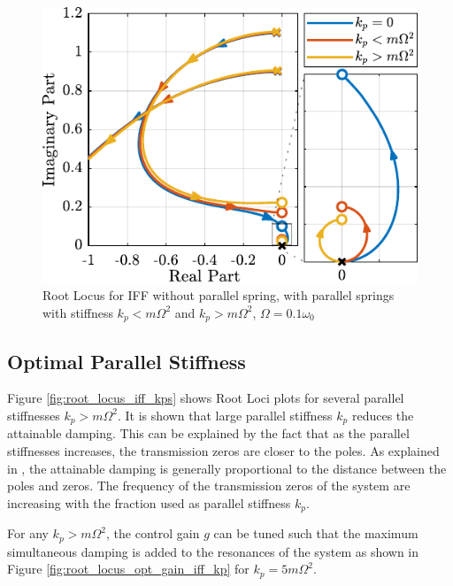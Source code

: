 \documentclass{ISMA_USD2020}
\begin{document}
\begin{figure}[htbp]
\centering
\includegraphics[scale=1]{figs/root_locus_iff_kp.pdf}
\caption{\label{fig:root_locus_iff_kp}Root Locus for IFF without parallel spring, with parallel springs with stiffness \(k_p < m \Omega^2\) and \(k_p > m \Omega^2\), \(\Omega = 0.1 \omega_0\)}
\end{figure}

\subsection{Optimal Parallel Stiffness}
\label{sec:org3826010}
Figure \ref{fig:root_locus_iff_kps} shows Root Loci plots for several parallel stiffnesses \(k_p > m \Omega^2\).
It is shown that large parallel stiffness \(k_p\) reduces the attainable damping.
This can be explained by the fact that as the parallel stiffnesses increases, the transmission zeros are closer to the poles.
As explained in \cite{preumont18_vibrat_contr_activ_struc_fourt_edition}, the attainable damping is generally proportional to the distance between the poles and zeros.
The frequency of the transmission zeros of the system are increasing with the fraction used as parallel stiffness \(k_p\).

For any \(k_p > m \Omega^2\), the control gain \(g\) can be tuned such that the maximum simultaneous damping is added to the resonances of the system as shown in Figure \ref{fig:root_locus_opt_gain_iff_kp} for \(k_p = 5 m \Omega^2\).
\end{document}
